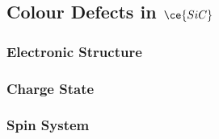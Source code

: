 \subsection{Colour Defects in $\ce{SiC}$}
\begin{figure}[H]
    \begin{center}
    \end{center}
    \caption{}\label{fig:}
\end{figure}

\subsubsection{Electronic Structure}
\subsubsection{Charge State}
\subsubsection{Spin System}




